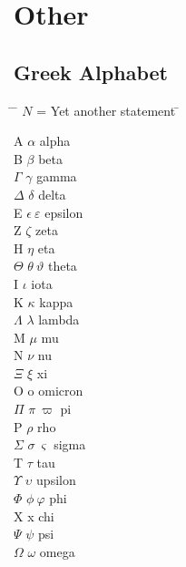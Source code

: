 \chapter{Other}

\section{Greek Alphabet}

\begin{multicols}{3}

\begin{tabbing}
	\hspace{2em} \= \hspace{3em} \= $N$ = Yet another statement \= \kill
	
	A           \>  $\alpha$                 \>  alpha    \\
	B           \>  $\beta$                  \>  beta     \\
	$\Gamma$    \>  $\gamma$                 \>  gamma    \\
	$\Delta$    \>  $\delta$                 \>  delta    \\
	E           \>  $\epsilon \ \varepsilon$ \>  epsilon  \\
	Z           \>  $\zeta$                  \>  zeta     \\
	H           \>  $\eta$                   \>  eta      \\
	$\Theta$    \>  $\theta \ \vartheta $    \>  theta    \\
	I           \>  $\iota$                  \>  iota     \\
	K           \>  $\kappa$                 \>  kappa    \\
	$\Lambda$   \>  $\lambda$                \>  lambda   \\
	M           \>  $\mu$                    \>  mu       \\
	N           \>  $\nu$                    \>  nu       \\
	$\Xi$       \>  $\xi$                    \>  xi       \\
	O           \>  o                        \>  omicron  \\
	$\Pi$       \>  $\pi \ \varpi $          \>  pi       \\
	P           \>  $\rho$                   \>  rho      \\
	$\Sigma$    \>  $\sigma \ \varsigma $    \>  sigma    \\
	T           \>  $\tau$                   \>  tau      \\
	$\Upsilon$  \>  $\upsilon$               \>  upsilon  \\
	$\Phi$      \>  $\phi \ \varphi $        \>  phi      \\
	X           \>  x                        \>  chi      \\
	$\Psi$      \>  $\psi$                   \>  psi      \\
	$\Omega$    \>  $\omega$                 \>  omega    \\
	
\end{tabbing}
\end{multicols}

